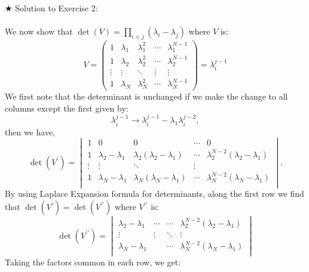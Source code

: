 \documentclass[letter,11pt]{article}
\begin{document}
\noindent $\bigstar$ Solution to Exercise 2:
\\ \\ 
We now show that $\det(V) = \prod_{i<j} (\lambda_i - \lambda_j)$ where $V$ is: 
\begin{equation*}
	V = 
	\begin{pmatrix}
		1 & \lambda_1 & \lambda_{1}^{2} & \cdots & \lambda_{1}^{N-1} \\
		1 & \lambda_2 & \lambda_{2}^{2} & \cdots & \lambda_{2}^{N-1} \\ 
		\vdots  & \vdots  & \ddots & \vdots & \vdots \\
		1 & \lambda_N & \lambda_{N}^{2} & \cdots & \lambda_{N}^{N-1} 
	\end{pmatrix} = \lambda_{i}^{j-1} 
\end{equation*}
We first note that the determinant is unchanged
if we make the change to all columns except the first given by:
\begin{equation}
	\lambda_{i}^{j-1} \to \lambda_{i}^{j-1} - \lambda_{1} \lambda_{i}^{j-2},
\end{equation}
then we have, 
\begin{equation}
	\det(V^{\prime}) = 
	\begin{vmatrix}
		1 & 0 & 0 & \cdots & 0 \\
		1 & \lambda_2 - \lambda_1 & \lambda_2(\lambda_2 - \lambda_1) & \cdots & \lambda_2^{N-2}(\lambda_2 - \lambda_1) \\ 
		\vdots  & \vdots  & \ddots & \vdots  \\
		1 & \lambda_N - \lambda_1 & \lambda_N(\lambda_N - \lambda_1) & \cdots & \lambda_N^{N-2}(\lambda_N - \lambda_1) \\
	\end{vmatrix}.
\end{equation}
By using Laplace Expansion formula for determinants, along the first row we find that $\det(V^{\prime}) = \det(V^{\prime\prime})$ where $V^{\prime\prime}$ is:
\begin{equation}
	\det(V^{\prime\prime}) = 
	\begin{vmatrix}
		 \lambda_2 - \lambda_1 & \cdots & \cdots & \lambda_2^{N-2}(\lambda_2 - \lambda_1) \\ 
		\vdots  & \vdots  & \ddots & \vdots  \\
		\lambda_N - \lambda_1 &  & \cdots &  \lambda_N^{N-2}(\lambda_N - \lambda_1) \\
	\end{vmatrix}
\end{equation}
Taking the factors common in each row, we get:
\end{document}
